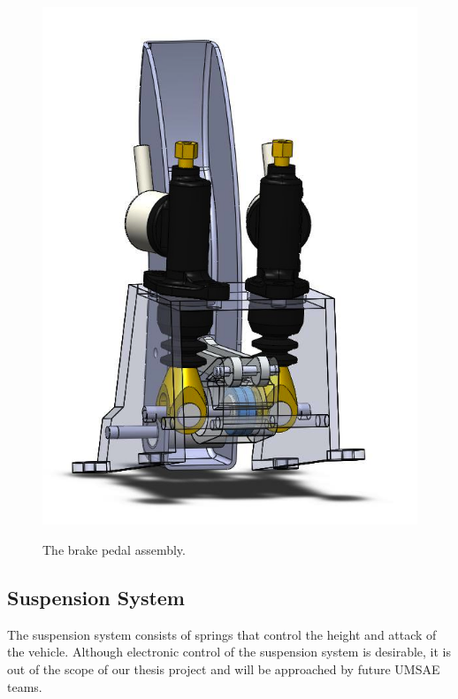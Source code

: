 \begin{figure}[h!]
{			\label{fig:brake_pedal_assy_b}\includegraphics[scale=0.4]{figures/brake_pedal_assy_b.png}}
    \caption{The brake pedal assembly.}
    \label{fig:brake_pedal_assy}
\end{figure}

\subsection{Suspension System}

The suspension system consists of springs that control the height and attack of the vehicle. 
Although electronic control of the suspension system is desirable, it is out of the scope of
our thesis project and will be approached by future UMSAE teams.



